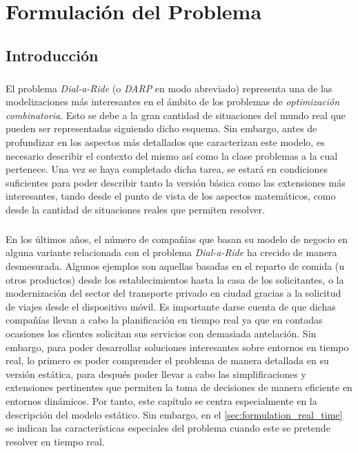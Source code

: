 \documentclass{subfiles}
\begin{document}
  \chapter{Formulación del Problema}
  \label{chap:formulation}

    \section{Introducción}
    \label{sec:formulation_introduction}

      \paragraph{}
      El problema \emph{Dial-a-Ride} (o \emph{DARP} en modo abreviado) representa una de las modelizaciones más interesantes en el ámbito de los problemas de \emph{optimización combinatoria}. Esto se debe a la gran cantidad de situaciones del mundo real que pueden ser representadas siguiendo dicho esquema. Sin embargo, antes de profundizar en los aspectos más detallados que caracterizan este modelo, es necesario describir el contexto del mismo así como la clase problemas a la cual pertenece. Una vez se haya completado dicha tarea, se estará en condiciones suficientes para poder describir tanto la versión básica como las extensiones más interesantes, tando desde el punto de vista de los aspectos matemáticos, como desde la cantidad de situaciones reales que permiten resolver.

      \paragraph{}
      En los últimos años, el número de compañias que basan su modelo de negocio en alguna variante relacionada con el problema \emph{Dial-a-Ride} ha crecido de manera desmesurada. Algunos ejemplos son aquellas basadas en el reparto de comida (u otros productos) desde los establecimientos hasta la casa de los solicitantes, o la modernización del sector del transporte privado en ciudad gracias a la solicitud de viajes desde el dispositivo móvil. Es importante darse cuenta de que dichas compañías llevan a cabo la planificación en tiempo real ya que en contadas ocasiones los clientes solicitan sus servicios con demasiada antelación. Sin embargo, para poder desarrollar soluciones interesantes sobre entornos en tiempo real, lo primero es poder comprender el problema de manera detallada en su versión estática, para después poder llevar a cabo las simplificaciones y extensiones pertinentes que permiten la toma de decisiones de manera eficiente en entornos dinámicos. Por tanto, este capítulo se centra especialmente en la descripción del modelo estático. Sin embargo, en el \cref{sec:formulation_real_time} se indican las características especiales del problema cuando este se pretende resolver en tiempo real.
\end{document}
